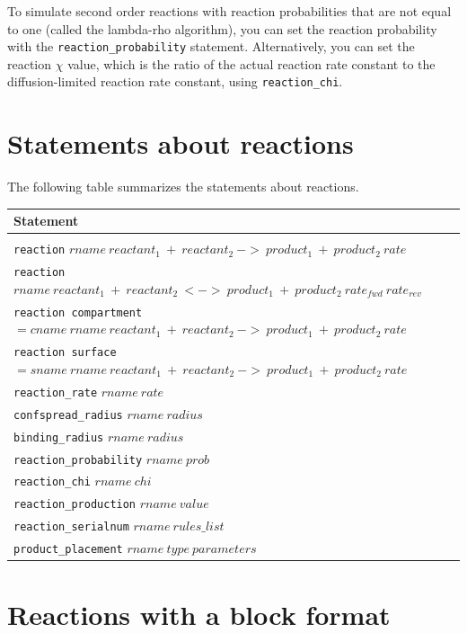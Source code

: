 \documentclass {scrbook}
\newcommand {\ttt} {\texttt}
\begin{document}
To simulate second order reactions with reaction probabilities that are not equal to one (called the lambda-rho algorithm), you can set the reaction probability with the \ttt{reaction\_probability} statement. Alternatively, you can set the reaction $\chi$ value, which is the ratio of the actual reaction rate constant to the diffusion-limited reaction rate constant, using \ttt{reaction\_chi}.

\section{Statements about reactions}

The following table summarizes the statements about reactions.

\begin{longtable}[c]{l}
Statement\\
\hline\\
\ttt{reaction} $rname\ reactant_1\ +\ reactant_2\ ->\ product_1\ +\ product_2\ rate$\\
\ttt{reaction} $rname\ reactant_1\ +\ reactant_2\ <->\ product_1\ +\ product_2\ rate_{fwd}\ rate_{rev}$\\
\ttt{reaction compartment}$=cname\ rname\ reactant_1\ +\ reactant_2\ ->\ product_1\ +\ product_2\ rate$\\
\ttt{reaction surface}$=sname\ rname\ reactant_1\ +\ reactant_2\ ->\ product_1\ +\ product_2\ rate$\\
\ttt{reaction\_rate} $rname\ rate$\\
\ttt{confspread\_radius} $rname\ radius$\\
\ttt{binding\_radius} $rname\ radius$\\
\ttt{reaction\_probability} $rname\ prob$\\
\ttt{reaction\_chi} $rname\ chi$\\
\ttt{reaction\_production} $rname\ value$\\
\ttt{reaction\_serialnum} $rname\ rules\_list$\\
\ttt{product\_placement} $rname\ type\ parameters$
\end{longtable}

\section{Reactions with a block format}
\end{document}
